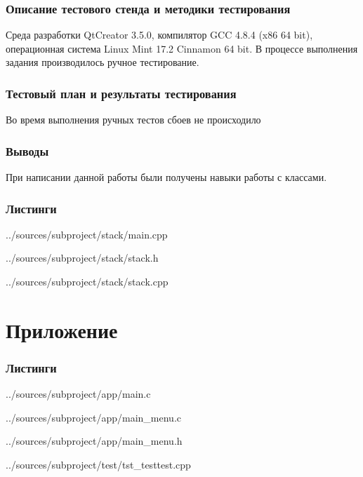 \documentclass[12pt,a4paper]{report}
\begin{document}
\subsection{Описание тестового стенда и методики тестирования}
Среда разработки QtCreator 3.5.0, компилятор GCC 4.8.4 (x86 64 bit), операционная система Linux Mint 17.2 Cinnamon 64 bit.
В процессе выполнения задания производилось ручное тестирование.
\subsection{Тестовый план и результаты тестирования}
Во время выполнения ручных тестов сбоев не происходило 
\subsection{Выводы}
При написании данной работы были получены навыки работы с классами.
\subsection*{Листинги}


{../sources/subproject/stack/main.cpp}


{../sources/subproject/stack/stack.h}

{../sources/subproject/stack/stack.cpp}
\chapter{Приложение}
\subsection*{Листинги}


{../sources/subproject/app/main.c}


{../sources/subproject/app/main_menu.c}


{../sources/subproject/app/main_menu.h}


{../sources/subproject/test/tst_testtest.cpp}
\end{document}
